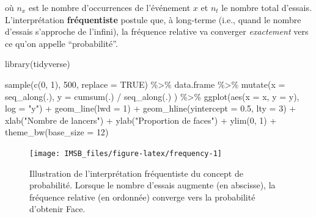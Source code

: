 \documentclass[
  a4paper,11pt,twoside,onecolumn,openright,final,oldfontcommands]{memoir}
\newenvironment{Shaded}{\begin{snugshade}}{\end{snugshade}}
\newcommand{\AttributeTok}[1]{\textcolor[rgb]{0.77,0.63,0.00}{#1}}
\newcommand{\ConstantTok}[1]{\textcolor[rgb]{0.00,0.00,0.00}{#1}}
\newcommand{\DecValTok}[1]{\textcolor[rgb]{0.00,0.00,0.81}{#1}}
\newcommand{\FloatTok}[1]{\textcolor[rgb]{0.00,0.00,0.81}{#1}}
\newcommand{\FunctionTok}[1]{\textcolor[rgb]{0.00,0.00,0.00}{#1}}
\newcommand{\NormalTok}[1]{#1}
\newcommand{\SpecialCharTok}[1]{\textcolor[rgb]{0.00,0.00,0.00}{#1}}
\newcommand{\StringTok}[1]{\textcolor[rgb]{0.31,0.60,0.02}{#1}}
\theoremstyle{definition}
\theoremstyle{definition}
\theoremstyle{definition}
\theoremstyle{definition}
\theoremstyle{remark}
\begin{document}
où \(n_{x}\) est le nombre d'occurrences de l'événement \(x\) et \(n_{t}\) le nombre total d'essais. L'interprétation \textbf{fréquentiste} postule que, à long-terme (i.e., quand le nombre d'essais s'approche de l'infini), la fréquence relative va converger \emph{exactement} vers ce qu'on appelle ``probabilité''.

\begin{Shaded}
\begin{Highlighting}[]
\FunctionTok{library}\NormalTok{(tidyverse)}

\FunctionTok{sample}\NormalTok{(}\FunctionTok{c}\NormalTok{(}\DecValTok{0}\NormalTok{, }\DecValTok{1}\NormalTok{), }\DecValTok{500}\NormalTok{, }\AttributeTok{replace =} \ConstantTok{TRUE}\NormalTok{) }\SpecialCharTok{\%\textgreater{}\%}
\NormalTok{        data.frame }\SpecialCharTok{\%\textgreater{}\%}
        \FunctionTok{mutate}\NormalTok{(}\AttributeTok{x =} \FunctionTok{seq\_along}\NormalTok{(.), }\AttributeTok{y =} \FunctionTok{cumsum}\NormalTok{(.) }\SpecialCharTok{/} \FunctionTok{seq\_along}\NormalTok{(.) ) }\SpecialCharTok{\%\textgreater{}\%}
        \FunctionTok{ggplot}\NormalTok{(}\FunctionTok{aes}\NormalTok{(}\AttributeTok{x =}\NormalTok{ x, }\AttributeTok{y =}\NormalTok{ y), }\AttributeTok{log =} \StringTok{"y"}\NormalTok{) }\SpecialCharTok{+}
        \FunctionTok{geom\_line}\NormalTok{(}\AttributeTok{lwd =} \DecValTok{1}\NormalTok{) }\SpecialCharTok{+}
        \FunctionTok{geom\_hline}\NormalTok{(}\AttributeTok{yintercept =} \FloatTok{0.5}\NormalTok{, }\AttributeTok{lty =} \DecValTok{3}\NormalTok{) }\SpecialCharTok{+}
        \FunctionTok{xlab}\NormalTok{(}\StringTok{"Nombre de lancers"}\NormalTok{) }\SpecialCharTok{+}
        \FunctionTok{ylab}\NormalTok{(}\StringTok{"Proportion de faces"}\NormalTok{) }\SpecialCharTok{+}
        \FunctionTok{ylim}\NormalTok{(}\DecValTok{0}\NormalTok{, }\DecValTok{1}\NormalTok{) }\SpecialCharTok{+}
        \FunctionTok{theme\_bw}\NormalTok{(}\AttributeTok{base\_size =} \DecValTok{12}\NormalTok{)}
\end{Highlighting}
\end{Shaded}

\begin{figure}[!htb]

{\centering \texttt{[image: IMSB\_files/figure-latex/frequency-1]} 

}

\caption{Illustration de l'interprétation fréquentiste du concept de probabilité. Lorsque le nombre d'essais augmente (en abscisse), la fréquence relative (en ordonnée) converge vers la probabilité d'obtenir Face.}\label{fig:frequency}
\end{figure}
\end{document}
